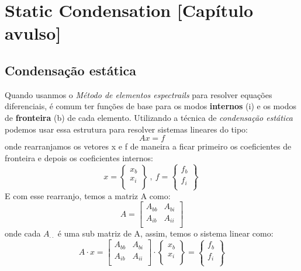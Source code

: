\chapter{Static Condensation [Capítulo avulso]}
\section{Condensação estática}
  Quando usanmos o \emph{Método de elementos espectrails} para resolver equações diferenciais, é comum ter funções de base para os modos  \textbf{internos} (i) e os modos de \textbf{fronteira} (b) de cada elemento. Utilizando a técnica de \emph{condensação estática} podemos usar essa estrutura para resolver sistemas lineares do tipo:
  \begin{equation}
   A x = f
  \end{equation}
onde rearranjamos os vetores x e f de maneira a ficar primeiro os coeficientes de fronteira e depois os coeficientes internos:
  \begin{equation}
    x = \left\{\begin{matrix} x_b \\ x_i \\ \end{matrix}\right\}\ ,\ f =  \left\{\begin{matrix} f_b \\ f_i \\ \end{matrix}\right\}\
  \end{equation}
E com esse rearranjo, temos a matriz A como:
\begin{equation}
A = \left[ 
\begin{matrix} 
A_{bb} & A_{bi} \\
A_{ib} & A_{ii} \\
\end{matrix}\right]
\end{equation}
onde cada $A_{\cdot \cdot}$ é uma sub matriz de A, assim, temos o sistema linear como:
\begin{equation}
A\cdot x  = \left[ 
\begin{matrix} 
A_{bb} & A_{bi} \\
A_{ib} & A_{ii} \\
\end{matrix}\right] \cdot \left\{
\begin{matrix} x_b \\ x_i \\ 
\end{matrix}\right\} = 
\left\{\begin{matrix} f_b \\ f_i \\\end{matrix}\right\} 
\end{equation}
